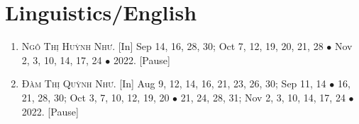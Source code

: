 \documentclass{article}
\numberwithin{equation}{section}
\begin{document}

\section{Linguistics\textsf{/}English}

\begin{enumerate}
	\item \textsc{Ngô Thị Huỳnh Như.} \textsf{[In]} Sep 14, 16, 28, 30; Oct 7, 12, 19, 20, 21, 28 $\bullet$ Nov 2, 3, 10, 14, 17, 24 $\bullet$ 2022. \textsf{[Pause]}
	\item \textsc{Đàm Thị Quỳnh Như.} \textsf{[In]} Aug 9, 12, 14, 16, 21, 23, 26, 30; Sep 11, 14 $\bullet$ 16, 21, 28, 30; Oct 3, 7, 10, 12, 19, 20 $\bullet$ 21, 24, 28, 31; Nov 2, 3, 10, 14, 17, 24 $\bullet$ 2022. \textsf{[Pause]}
\end{enumerate}


\printbibliography[heading=bibintoc]
	
\end{document}
